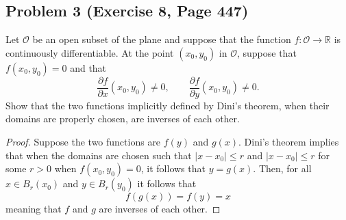 \documentclass{article}
\begin{document}
\subsection*{Problem 3 (Exercise 8, Page 447)}
Let $\mathcal{O}$ be an open subset of the plane and suppose that the function $f \colon \mathcal{O} \to \mathbb{R}$ is continuously differentiable. At the point $(x_0, y_0)$ in $\mathcal{O}$, suppose that $f(x_0, y_0) = 0$ and that
\[ \frac{\partial f}{\partial x}(x_0, y_0) \neq 0, \qquad \frac{\partial f}{\partial y}(x_0, y_0) \neq 0.\]
Show that the two functions implicitly defined by Dini's theorem, when their domains are properly chosen, are inverses of each other.
\begin{proof}
Suppose the two functions are $f(y)$ and $g(x)$. Dini's theorem implies that when the domains are chosen such that $|x-x_0| \leq r$ and $|x-x_0| \leq r$ for some $r > 0$ when $f(x_0, y_0) = 0$, it follows that $y = g(x)$. Then, for all $x \in B_r(x_0)$ and $y \in B_r(y_0)$ it follows that 
\[ f(g(x)) = f(y) = x\]
meaning that $f$ and $g$ are inverses of each other.
\end{proof}
\end{document}
